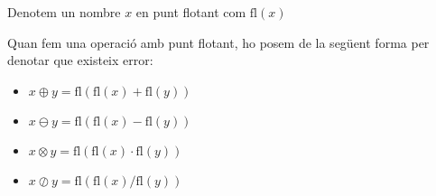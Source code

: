 \documentclass[../main.tex]{subfiles}
\begin{document}
    \begin{notacio}
        Denotem un nombre $x$ en punt flotant com $\text{fl} \left(x\right)$
    \end{notacio}
    \begin{notacio}
        Quan fem una operació amb punt flotant, ho posem de la següent forma per denotar que
        existeix error:
        \begin{itemize}
            \item $x \oplus y = \text{fl}\left( \text{fl}\left( x \right) + \text{fl}\left( y \right)\right)$
            \item $x \ominus y = \text{fl}\left( \text{fl}\left( x \right) - \text{fl}\left( y \right)\right)$
            \item $x \otimes y = \text{fl}\left( \text{fl}\left( x \right) \cdot \text{fl}\left( y \right)\right)$
            \item $x \oslash y = \text{fl}\left( \text{fl}\left( x \right) / \text{fl}\left( y \right)\right)$
        \end{itemize}
    \end{notacio}
\end{document}
